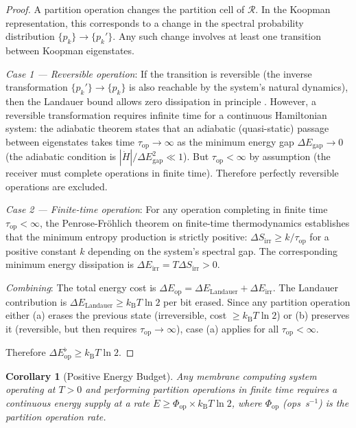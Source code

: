 \documentclass[11pt,twocolumn,a4paper]{article}
\newtheorem{corollary}[theorem]{Corollary}
\theoremstyle{definition}
\theoremstyle{remark}
\newcommand{\kB}{k_{\mathrm{B}}}
\begin{document}
\begin{proof}
A partition operation changes the partition cell of $\mathcal{R}$. In the
Koopman representation, this corresponds to a change in the spectral
probability distribution $\{p_k\} \to \{p_k'\}$. Any such change involves
at least one transition between Koopman eigenstates.

\textit{Case 1 --- Reversible operation}: If the transition is reversible
(the inverse transformation $\{p_k'\} \to \{p_k\}$ is also reachable by
the system's natural dynamics), then the Landauer bound allows zero dissipation
in principle \citep{bennett1973}. However, a reversible transformation requires
infinite time for a continuous Hamiltonian system: the adiabatic theorem
\citep{born1928, messiah1962} states that an adiabatic (quasi-static) passage
between eigenstates takes time $\tau_{\mathrm{op}} \to \infty$ as the minimum
energy gap $\Delta E_{\mathrm{gap}} \to 0$ (the adiabatic condition is
$|\dot{H}| / \Delta E_{\mathrm{gap}}^2 \ll 1$). But $\tau_{\mathrm{op}} < \infty$
by assumption (the receiver must complete operations in finite time). Therefore
perfectly reversible operations are excluded.

\textit{Case 2 --- Finite-time operation}: For any operation completing in
finite time $\tau_{\mathrm{op}} < \infty$, the Penrose-Fröhlich theorem on
finite-time thermodynamics \citep{penrose1970, andresen1984} establishes that
the minimum entropy production is strictly positive:
$\Delta S_{\mathrm{irr}} \geq k / \tau_{\mathrm{op}}$ for a positive constant
$k$ depending on the system's spectral gap. The corresponding minimum
energy dissipation is $\Delta E_{\mathrm{irr}} = T \Delta S_{\mathrm{irr}} > 0$.

\textit{Combining}: The total energy cost is $\Delta E_{\mathrm{op}} = \Delta
E_{\mathrm{Landauer}} + \Delta E_{\mathrm{irr}}$. The Landauer contribution
is $\Delta E_{\mathrm{Landauer}} \geq \kB T \ln 2$ per bit erased. Since any
partition operation either (a) erases the previous state (irreversible, cost
$\geq \kB T \ln 2$) or (b) preserves it (reversible, but then requires
$\tau_{\mathrm{op}} \to \infty$), case (a) applies for all
$\tau_{\mathrm{op}} < \infty$.

Therefore $\Delta E_{\mathrm{op}}^{\flat} \geq \kB T \ln 2$.
\end{proof}

\begin{corollary}[Positive Energy Budget]
\label{cor:posbudget}
Any membrane computing system operating at $T > 0$ and performing partition
operations in finite time requires a continuous energy supply at a rate
$\dot{E} \geq \Phi_{\mathrm{op}} \times \kB T \ln 2$, where
$\Phi_{\mathrm{op}}$ (ops~s$^{-1}$) is the partition operation rate.
\end{corollary}
\end{document}
